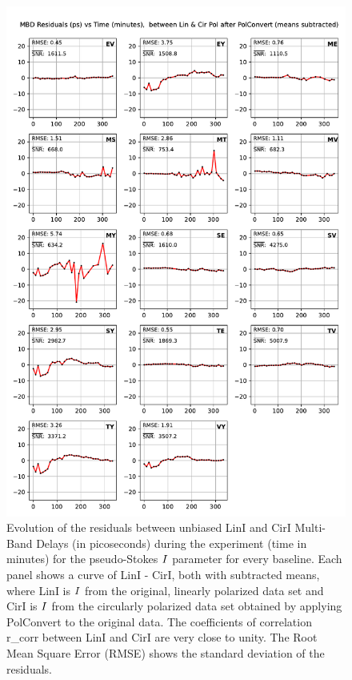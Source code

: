 \documentclass[letterpaper,twoside,12pt]{article}
\begin{document}
\begin{figure}[ht!]
  \begin{center}
  \includegraphics[width=33pc]{MBD_Lin_I_minus_Cir_I.pdf}
  \caption{\small Evolution of the residuals between unbiased LinI and CirI Multi-Band Delays (in picoseconds) during the experiment (time in minutes) for the pseudo-Stokes $\protect I$ parameter for every baseline. Each panel shows a curve of LinI - CirI, both with subtracted means, where LinI is $\protect I$ from the original, linearly polarized data set and CirI is $\protect I$ from the circularly polarized data set obtained by applying PolConvert to the original data. The coefficients of correlation r\_corr between LinI and CirI are very close to unity. The Root Mean Square Error (RMSE) shows the standard deviation of the residuals.}
  \label{mbd_lin_minus_cir}
  \end{center}
\end{figure}
\end{document}
